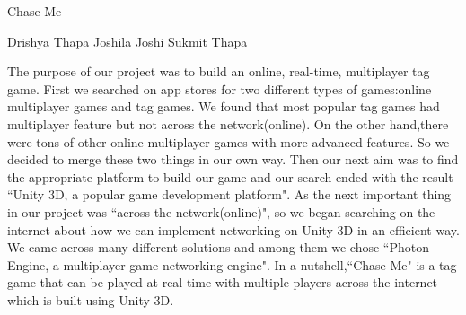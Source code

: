  \begin{conf-abstract}[]
 {Chase Me}
 {Drishya Thapa
  	Joshila Joshi
 	Sukmit Thapa 

 }
{}

The purpose of our project was to build an online, real-time, multiplayer tag game. First we searched on app stores for two different types of games:online multiplayer games and tag games. We found that most popular tag games had multiplayer feature but not across the network(online). On the other hand,there were tons of other online multiplayer games with more advanced features. So we decided to merge these two things in our own way. Then our next aim was to find the appropriate platform to build our game and our search ended with the result ``Unity 3D, a popular game development platform". As the next important thing in our project was ``across the network(online)", so we began searching on the internet about how we can  implement networking on Unity 3D in an efficient way. We came across many different solutions and among them we chose ``Photon Engine, a multiplayer game networking engine". In a nutshell,``Chase Me" is a tag game that can be played at real-time with multiple players across the internet which is built using Unity 3D. 
 \end{conf-abstract}